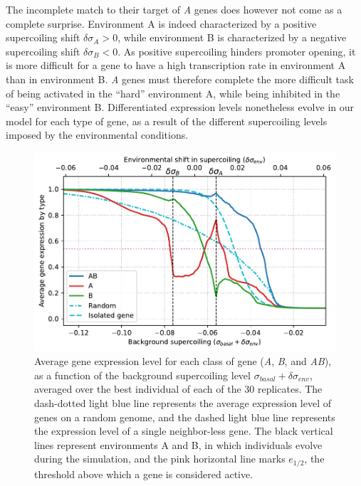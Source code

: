 The incomplete match to their target of \emph{A} genes does however not come as a complete surprise.
Environment A is indeed characterized by a positive supercoiling shift $\delta\sigma_A > 0$, while environment B is characterized by a negative supercoiling shift $\delta\sigma_B < 0$.
As positive supercoiling hinders promoter opening, it is more difficult for a gene to have a high transcription rate in environment A than in environment B.
\emph{A} genes must therefore complete the more difficult task of being activated in the ``hard'' environment A, while being inhibited in the ``easy'' environment B.
Differentiated expression levels nonetheless evolve in our model for each type of gene, as a result of the different supercoiling levels imposed by the environmental conditions.

\begin{figure}[H]
  \centering
  \includegraphics[width=\textwidth]{ploscb/img/activity_sigmas_avg.pdf}
  \caption[Average gene expression as a function of background supercoiling at the end of evolution in the advanced model]{Average gene expression level for each class of gene (\emph{A}, \emph{B}, and \emph{AB}), as a function of the background supercoiling level $\sigma_{basal} + \delta\sigma_{env}$, averaged over the best individual of each of the 30 replicates.
  The dash-dotted light blue line represents the average expression level of genes on a random genome, and the dashed light blue line represents the expression level of a single neighbor-less gene.
  The black vertical lines represent environments A and B, in which individuals evolve during the simulation, and the pink horizontal line marks $e_{1/2}$, the threshold above which a gene is considered active.}
  \label{fig:ploscb:activity-by-sigma}
\end{figure}

